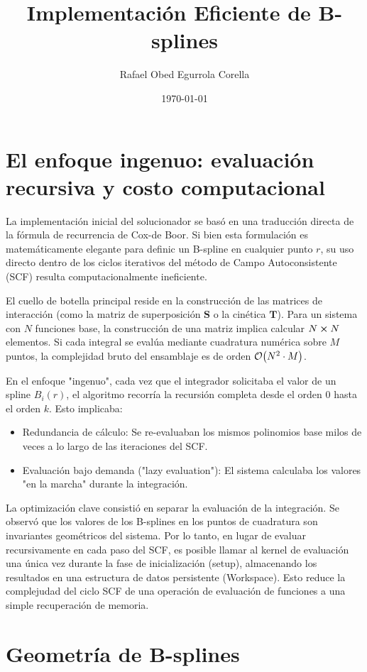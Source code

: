\documentclass[12pt, a4paper, oneside, spanish]{article}
\title{\textbf{Implementación Eficiente de B-splines}}
\author{Rafael Obed Egurrola Corella}
\date{\today}
\begin{document}
\section{El enfoque ingenuo: evaluación recursiva y costo computacional}

La implementación inicial del solucionador se basó en una traducción directa de la fórmula de recurrencia de Cox-de Boor. Si bien esta formulación es matemáticamente elegante para definic un B-spline en cualquier punto \( r \), su uso directo dentro de los ciclos iterativos del método de Campo Autoconsistente (SCF) resulta computacionalmente ineficiente.

El cuello de botella principal reside en la construcción de las matrices de interacción (como la matriz de superposición \( \bm{S} \) o la cinética \( \bm{T} \)). Para un sistema con \( N \) funciones base, la construcción de una matriz implica calcular \( N \cross N \) elementos. Si cada integral se evalúa mediante cuadratura numérica sobre \( M \) puntos, la complejidad bruto del ensamblaje es de orden \( \order{N^2\cdot M} \).

En el enfoque "ingenuo", cada vez que el integrador solicitaba el valor de un spline \( B_i(r) \), el algoritmo recorría la recursión completa desde el orden 0 hasta el orden \( k \). Esto implicaba:

\begin{itemize}
\item Redundancia de cálculo: Se re-evaluaban los mismos polinomios base milos de veces a lo largo de las iteraciones del SCF.
\item Evaluación bajo demanda ("lazy evaluation"): El sistema calculaba los valores "en la marcha" durante la integración.
\end{itemize}

La optimización clave consistió en separar la evaluación de la integración. Se observó que los valores de los B-splines en los puntos de cuadratura son invariantes geométricos del sistema. Por lo tanto, en lugar de evaluar recursivamente en cada paso del SCF, es posible llamar al kernel de evaluación una única vez durante la fase de inicialización (setup), almacenando los resultados en una estructura de datos persistente (Workspace). Esto reduce la complejudad del ciclo SCF de una operación de evaluación de funciones a una simple recuperación de memoria.

\section{Geometría de B-splines}
\end{document}
